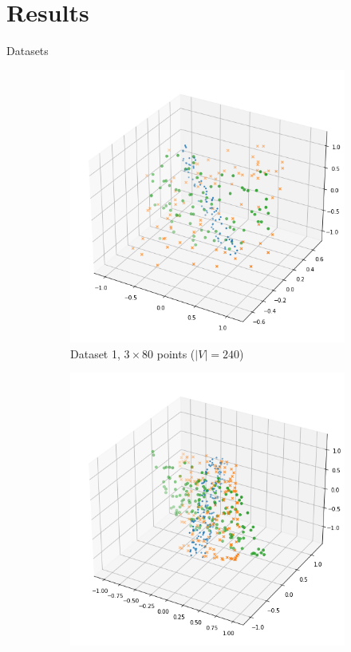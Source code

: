 \documentclass[10pt]{beamer}
\begin{document}
\section{Results}
\begin{frame}{Datasets}
    \begin{figure}
        \centering
        \begin{subfigure}{0.23\textwidth}
            \centering
            \includegraphics[width=\textwidth]{pics/ds1.png}
            \caption{Dataset 1, $3 \times 80$ points ($|V|=240$)}
        \end{subfigure}%
        \hspace{0.2em}
        \begin{subfigure}{0.23\textwidth}
            \centering
            \includegraphics[width=\textwidth]{pics/ds2.png}

\end{subfigure}
\end{figure}
\end{frame}
\end{document}

